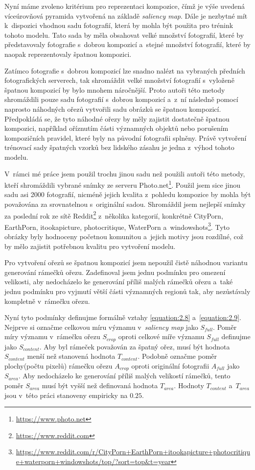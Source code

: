 Nyní máme zvoleno kritérium pro reprezentaci kompozice, čímž je výše uvedená víceúrovňová pyramida vytvořená na základě \emph{saliency map}. Dále je nezbytné mít k~dispozici vhodnou sadu fotografií, která by mohla být použita pro trénink tohoto modelu. Tato sada by měla obsahovat velké množství fotografií, které by představovaly fotografie s~dobrou kompozicí a~stejné množství fotografií, které by naopak reprezentovaly špatnou kompozici.

Zatímco fotografie s~dobrou kompozicí lze snadno nalézt na vybraných předních fotografických serverech, tak shromáždit velké množství fotografií s~vyloženě špatnou kompozicí by bylo mnohem náročnější. Proto autoři této metody shromáždili pouze sadu fotografií s~dobrou kompozicí a~z~ní následně pomocí naprosto náhodných ořezů vytvořili sadu obrázků se špatnou kompozicí. Předpokládá se, že tyto náhodné ořezy by měly zajistit dostatečně špatnou kompozici, například oříznutím části významných objektů nebo porušením kompozičních pravidel, které byly na původní fotografii splněny. Právě vytvoření trénovací sady špatných vzorků bez lidského zásahu je jedna z~výhod tohoto modelu.

V~rámci mé práce jsem použil trochu jinou sadu než použili autoři této metody, kteří shromáždili vybrané snímky ze serveru Photo.net\footnote{\url{https://www.photo.net}}. Použil jsem sice jinou sadu asi 2000 fotografií, nicméně jejich kvalita z~pohledu kompozice by mohla být považována za srovnatelnou s~originální sadou. Shromáždil jsem nejlepší snímky za poslední rok ze sítě Reddit\footnote{\url{https://www.reddit.com}} z~několika kategorií, konkrétně CityPorn, EarthPorn, itookapicture, photocritique, WaterPorn a~windowshots\footnote{\url{https://www.reddit.com/r/CityPorn+EarthPorn+itookapicture+photocritique+waterporn+windowshots/top/?sort=top&t=year}}. Tyto obrázky byly hodnoceny početnou komunitou a~jejich motivy jsou rozdílné, což by mělo zajistit potřebnou kvalitu pro vytvoření modelu.

Pro vytvoření ořezů se špatnou kompozicí jsem nepoužil čistě náhodnou variantu generování rámečků ořezu. Zadefinoval jsem jednu podmínku pro omezení velikosti, aby nedocházelo ke generování příliš malých rámečků ořezu a~také jednu podmínku pro vyjmutí větší části významných regionů tak, aby nezůstávaly kompletně v~rámečku ořezu.

Nyní tyto podmínky definujme formálně vztahy \ref{equation:2.8} a~\ref{equation:2.9}. Nejprve si označme celkovou míru významu v~\emph{saliency map} jako $S_{full}$. Poměr míry významu v~rámečku ořezu $S_{crop}$ oproti celkové míře významu $S_{full}$ definujme jako $S_{content}$. Aby byl rámeček považován za špatný ořez, musí být hodnota $S_{content}$ menší než stanovená hodnota $T_{content}$. Podobně označme poměr plochy(počtu pixelů) rámečku ořezu $A_{crop}$ oproti originální fotografii $A_{full}$ jako $S_{area}$. Aby nedocházelo ke generování příliš malých velikostí rámečků, tento poměr $S_{area}$ musí být vyšší než definovaná hodnota $T_{area}$. Hodnoty $T_{content}$ a~$T_{area}$ jsou v~této práci stanoveny empiricky na $0.25$.

